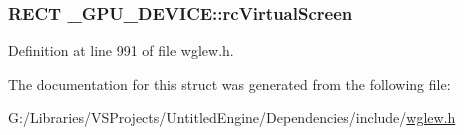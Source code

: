 \subsubsection[{rc\+Virtual\+Screen}]{\setlength{\rightskip}{0pt plus 5cm}R\+E\+C\+T \+\_\+\+G\+P\+U\+\_\+\+D\+E\+V\+I\+C\+E\+::rc\+Virtual\+Screen}\label{struct___g_p_u___d_e_v_i_c_e_aeb573bbeb3b6c589246720ef259b9a27}


Definition at line 991 of file wglew.\+h.



The documentation for this struct was generated from the following file\+:\begin{DoxyCompactItemize}
\item 
G\+:/\+Libraries/\+V\+S\+Projects/\+Untitled\+Engine/\+Dependencies/include/\hyperlink{wglew_8h}{wglew.\+h}\end{DoxyCompactItemize}
